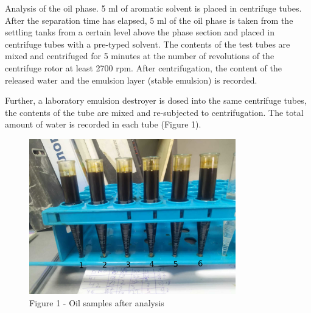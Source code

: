 \begin{multicols}{2}
Analysis of the oil phase. 5 ml of aromatic solvent is placed in
centrifuge tubes. After the separation time has elapsed, 5 ml of the oil
phase is taken from the settling tanks from a certain level above the
phase section and placed in centrifuge tubes with a pre-typed solvent.
The contents of the test tubes are mixed and centrifuged for 5 minutes
at the number of revolutions of the centrifuge rotor at least 2700 rpm.
After centrifugation, the content of the released water and the emulsion
layer (stable emulsion) is recorded.

Further, a laboratory emulsion destroyer is dosed into the same
centrifuge tubes, the contents of the tube are mixed and re-subjected to
centrifugation. The total amount of water is recorded in each tube
(Figure 1).
\end{multicols}

\begin{figure}[H]
	\centering
	\includegraphics[width=0.8\textwidth]{assets/1075}
	\caption*{Figure 1 - Oil samples after analysis}
\end{figure}

